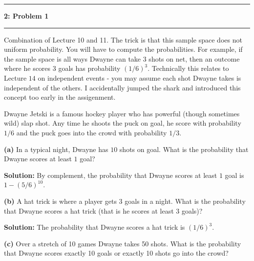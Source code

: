 \documentclass[11pt]{article}
\newcommand\question[2]{\vspace{.25in}\hrule\textbf{#1: #2}\vspace{.5em}\hrule\vspace{.10in}}
\renewcommand\part[1]{\vspace{.10in}\textbf{(#1)}}
\newcommand{\solution}{\vspace{.10in}\textbf{Solution: }}
\begin{document}
\raggedright
\newcommand\NAME{Carl Kingsford}  %
\newcommand\ANDREWID{ckingsf}     %
\newcommand\HWNUM{1}              %



\question{2}{Problem 1}
Combination of Lecture 10 and 11. The trick is that this sample space does not uniform
probability. You will have to compute the probabilities. For example, if the sample space is all ways Dwayne
can take $3$ shots on net, then an outcome where he scores $3$ goals has probability $(1/6)^3$. Technically this relates to 
Lecture $14$ on independent events - you may assume each shot Dwayne takes is independent of the others. I accidentally jumped the shark and introduced this concept too
early in the assigenment.

Dwayne Jetski is a famous hockey player who has powerful (though sometimes wild) slap shot. Any time he shoots the puck on goal, he score with probability $1/6$ and the puck goes into the
crowd with probability $1/3$.

\part{a} In a typical night, Dwayne has $10$ shots on goal. What is the probability that Dwayne scores at least $1$ goal?

\solution
By complement, the probability that Dwayne scores at least $1$ goal is $1 - (5/6)^{10}$.

\part{b} 
A hat trick is where a player gets 3 goals in a night. What is the probability that Dwayne scores a hat trick (that is he scores at least 3 goals)?

\solution
The probability that Dwayne scores a hat trick is $(1/6)^3$.

\part{c}
Over a stretch of 10 games Dwayne takes 50 shots. What is the probability that Dwayne scores exactly 10 goals or exactly 10 shots go into the crowd?
\end{document}
